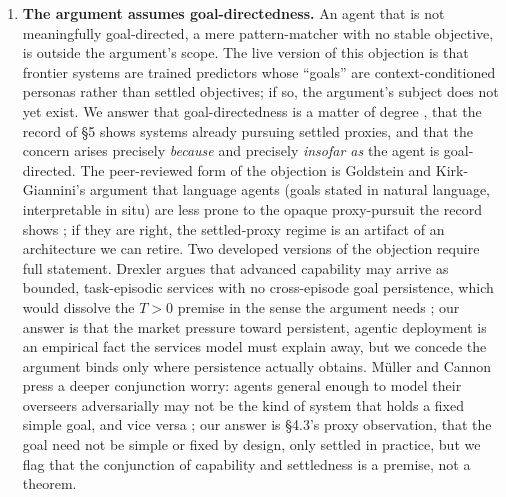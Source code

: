\documentclass[11pt]{article}
\theoremstyle{definition}
\begin{document}
\begin{enumerate}[leftmargin=1.5em]
    \item \textbf{The argument assumes goal-directedness.} An agent that is not meaningfully goal-directed, a mere pattern-matcher with no stable objective, is outside the argument's scope. The live version of this objection is that frontier systems are trained predictors whose ``goals'' are context-conditioned personas rather than settled objectives; if so, the argument's subject does not yet exist. We answer that goal-directedness is a matter of degree \cite{macdermott2024measuring}, that the record of \S5 shows systems already pursuing settled proxies, and that the concern arises precisely \emph{because} and precisely \emph{insofar as} the agent is goal-directed. The peer-reviewed form of the objection is Goldstein and Kirk-Giannini's argument that language agents (goals stated in natural language, interpretable in situ) are less prone to the opaque proxy-pursuit the record shows \cite{goldstein2023language}; if they are right, the settled-proxy regime is an artifact of an architecture we can retire. Two developed versions of the objection require full statement. Drexler argues that advanced capability may arrive as bounded, task-episodic services with no cross-episode goal persistence, which would dissolve the $T > 0$ premise in the sense the argument needs \cite{drexler2019reframing}; our answer is that the market pressure toward persistent, agentic deployment is an empirical fact the services model must explain away, but we concede the argument binds only where persistence actually obtains. M\"uller and Cannon press a deeper conjunction worry: agents general enough to model their overseers adversarially may not be the kind of system that holds a fixed simple goal, and vice versa \cite{muller2022orthogonality}; our answer is \S4.3's proxy observation, that the goal need not be simple or fixed by design, only settled in practice, but we flag that the conjunction of capability and settledness is a premise, not a theorem.

\end{enumerate}
\end{document}
